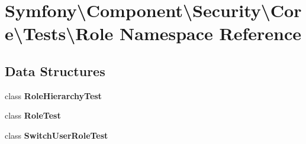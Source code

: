 \section{Symfony\textbackslash{}Component\textbackslash{}Security\textbackslash{}Core\textbackslash{}Tests\textbackslash{}Role Namespace Reference}
\label{namespace_symfony_1_1_component_1_1_security_1_1_core_1_1_tests_1_1_role}
\subsection*{Data Structures}
\begin{DoxyCompactItemize}
\item 
class {\bf Role\+Hierarchy\+Test}
\item 
class {\bf Role\+Test}
\item 
class {\bf Switch\+User\+Role\+Test}
\end{DoxyCompactItemize}
